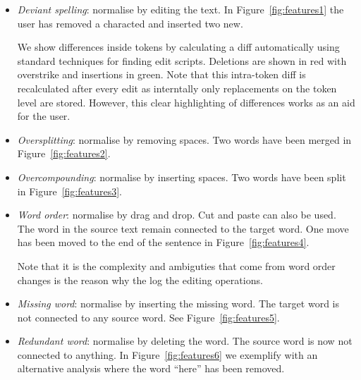 \documentclass[10pt, a4paper]{article}
\newcommand{\dan}[1]{{\color{Fuchsia}{Dan: #1}}}
\begin{document}
\begin{itemize}
\item {\it Deviant spelling}: normalise by editing the text.
In Figure~\ref{fig:features1} the user has removed a characted
and inserted two new.

We show differences inside tokens by
calculating a diff automatically using standard techniques for finding
edit scripts.  Deletions are shown in red with overstrike and insertions
in green. %
Note that this intra-token diff is recalculated after every edit
as interntally only replacements on the token level are stored.  However,
this clear highlighting of differences works as an aid for the user.

\item {\it Oversplitting}: normalise by removing spaces.
Two words have been merged in Figure~\ref{fig:features2}.

\item {\it Overcompounding}: normalise by inserting spaces.
Two words have been split in Figure~\ref{fig:features3}.

\item {\it Word order}: normalise by drag and drop. Cut and paste can also be used.
The word in the source text remain connected to the target word.
One move has been moved to the end of the sentence in Figure~\ref{fig:features4}.

Note that it is the complexity and ambiguties that come from word order changes
is the reason why the log the editing operations.


\item {\it Missing word}: normalise by inserting the missing word.
The target word is not connected to any source word.
See Figure~\ref{fig:features5}.

\item {\it Redundant word}: normalise by deleting the word.
The source word is now not connected to anything.
In Figure~\ref{fig:features6} we exemplify with
an alternative analysis where the word ``here'' has been removed.

\end{itemize}
\end{document}
